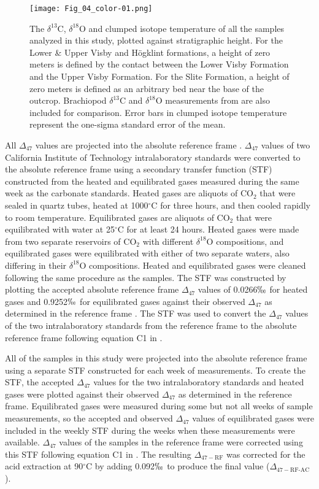 \documentclass[5p, authoryear]{elsarticle}
\begin{document}
\begin{figure*}[t]
\centering
\texttt{[image: Fig\_04\_color-01.png]}
\caption{The $\delta^{13}$C, $\delta^{18}$O and clumped isotope temperature of all the samples analyzed in this study, plotted against stratigraphic height. For the Lower \& Upper Visby and H\"{o}gklint formations, a height of zero meters is defined by the contact between the Lower Visby Formation and the Upper Visby Formation. For the Slite Formation, a height of zero meters is defined as an arbitrary bed near the base of the outcrop. Brachiopod $\delta^{13}$C and $\delta^{18}$O measurements from \cite{Munnecke2003} are also included for comparison. Error bars in clumped isotope temperature represent the one-sigma standard error of the mean.}
\label{section}
\end{figure*}

All $\Delta_{47}$ values are projected into the absolute reference frame \citep{Dennis2011}. $\Delta_{47}$ values of two California Institute of Technology intralaboratory standards were converted to the absolute reference frame using a secondary transfer function (STF) constructed from the heated and equilibrated gases measured during the same week as the carbonate standards. Heated gases are aliquots of CO$_2$ that were sealed in quartz tubes, heated at 1000$^{\circ}$C for three hours, and then cooled rapidly to room temperature. Equilibrated gases are aliquots of CO$_2$ that were equilibrated with water at 25$^{\circ}$C for at least 24 hours. Heated gases were made from two separate reservoirs of CO$_2$ with different $\delta^{18}$O compositions, and equilibrated gases were equilibrated with either of two separate waters, also differing in their $\delta^{18}$O compositions. Heated and equilibrated gases were cleaned following the same procedure as the samples. The STF was constructed by plotting the accepted absolute reference frame $\Delta_{47}$ values of 0.0266$\permil$ for heated gases and 0.9252$\permil$ for equilibrated gases against their observed $\Delta_{47}$ as determined in the \cite{Ghosh2006} reference frame \citep{Dennis2011}. The STF was used to convert the $\Delta_{47}$ values of the two intralaboratory standards from the \cite{Ghosh2006} reference frame to the absolute reference frame following equation C1 in \cite{Dennis2011}. 

All of the samples in this study were projected into the absolute reference frame using a separate STF constructed for each week of measurements. To create the STF, the accepted $\Delta_{47}$ values for the two intralaboratory standards and heated gases were plotted against their observed $\Delta_{47}$ as determined in the \cite{Ghosh2006} reference frame. Equilibrated gases were measured during some but not all weeks of sample measurements, so the accepted and observed $\Delta_{47}$ values of equilibrated gases were included in the weekly STF during the weeks when these measurements were available. $\Delta_{47}$ values of the samples in the \cite{Ghosh2006} reference frame were corrected using this STF following equation C1 in \cite{Dennis2011}. The resulting $\Delta_{47-\text{RF}}$ was corrected for the acid extraction at 90$^{\circ}$C by adding 0.092$\permil$ \citep{Henkes2013} to produce the final value ($\Delta_{47-\text{RF-AC}}$).
\end{document}
